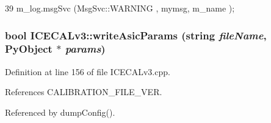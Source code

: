 \begin{DoxyCode}
39 { m_log.msgSvc (MsgSvc::WARNING , mymsg, m_name ); }
\end{DoxyCode}
\hypertarget{classICECALv3_a9d7c33e6d113e7f721dc848d28ab44d8}{
\subsubsection[{writeAsicParams}]{\setlength{\rightskip}{0pt plus 5cm}bool ICECALv3::writeAsicParams (string {\em fileName}, \/  PyObject $\ast$ {\em params})}}
\label{classICECALv3_a9d7c33e6d113e7f721dc848d28ab44d8}


Definition at line 156 of file ICECALv3.cpp.

References CALIBRATION\_\-FILE\_\-VER.

Referenced by dumpConfig().


